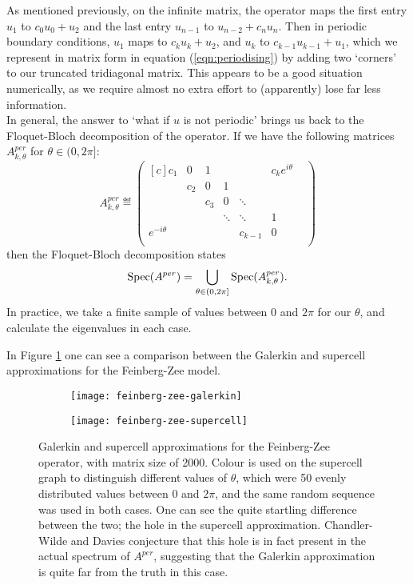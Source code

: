 \documentclass[../main.tex]{subfiles}
\begin{document}
As mentioned previously, on the infinite matrix, the operator maps the first
entry $u_1$ to $c_0 u_0 + u_2$ and the last entry $u_{n-1}$ to $u_{n-2} + c_{n}
u_{n}$. Then in periodic boundary conditions, $u_1$ maps to $c_k u_k + u_2$, and
$u_{k}$ to $c_{k-1} u_{k-1} + u_{1}$, which we represent in matrix form in
equation (\ref{eqn:periodising}) by adding two `corners' to our truncated
tridiagonal matrix. This appears to be a good situation numerically, as we
require almost no extra effort to (apparently) lose far less information.\\

In general, the answer to `what if $u$ is not periodic' brings us back to the
Floquet-Bloch decomposition of the operator. If we have the following matrices
$A^{per}_{k, \theta}$ for $\theta \in (0, 2 \pi]$:
  $$ 
  A^{per}_{k, \theta} \eqdef
  \begin{pmatrix*}[c]
    c_1 & 0 & 1 & & & c_{k} e^{i \theta}\\
    & c_2 & 0 & 1 & & & \\
    & & c_3 & 0 & \ddots & & \\
    & & & \ddots & \ddots & 1 & \\
    e^{- i \theta} & & & & c_{k-1} & 0 \\
  \end{pmatrix*} 
  $$
then the Floquet-Bloch decomposition states 
  $$\mathrm{Spec}(A^{per}) = \bigcup_{\theta \in (0, 2 \pi]} \mathrm{Spec}(A^{per}_{k, \theta}).$$
In practice, we take a finite sample of values between 0 and $2 \pi$ for our
$\theta$, and calculate the eigenvalues in each case. 

In Figure \ref{fig:feinberg-zee} one can see a comparison between the Galerkin
and supercell approximations for the Feinberg-Zee model. 

\begin{figure}[p!]
\centering
\begin{subfigure}{0.4\textwidth}
  \texttt{[image: feinberg-zee-galerkin]}
  \end{subfigure} \begin{subfigure}{0.4\textwidth}
  \texttt{[image: feinberg-zee-supercell]} \end{subfigure}
  \caption{Galerkin and supercell approximations for the Feinberg-Zee operator,
	with matrix size of 2000. Colour is used on the supercell graph to
	distinguish different values of $\theta$, which were 50 evenly
	distributed values between $0$ and $2 \pi$, and the same random
	sequence was used in both cases. One can see the quite startling
	difference between the two; the hole in the supercell approximation.
	Chandler-Wilde and Davies \cite{chandler-wilde2012spectrum} conjecture
	that this hole is in fact present in the actual spectrum of $A^{per}$,
        suggesting that the Galerkin approximation is quite far from the truth
        in this case.}
\label{fig:feinberg-zee}
\end{figure}
\clearpage
\end{document}
